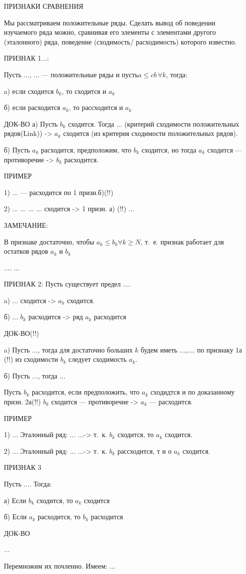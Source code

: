 \documentclass[../../main.tex]{subfiles}
\begin{document}
ПРИЗНАКИ СРАВНЕНИЯ

Мы рассматриваем положительные ряды.
Сделать вывод об поведении изучаемого ряда
можно, сравнивая его элементы с  элементами
другого (эталонного) ряда,  поведение (сходимость\slash
расходимость) которого известно.

ПРИЗНАК 1...:

Пусть ..., ... --- положительные ряды и пусть$a \leq cb \, \forall k$,
тогда:

a) если сходится $b_k$, то сходится и $a_k$

б) если расходится $a_k$, то рассходится и $a_k$

ДОК-ВО
а) Пусть $b_k$ сходится. Тогда ... 
(критерий сходимости положительных рядов(Link))
-> $a_k$ сходится (из критерия сходимости положительных рядов).

б) Пусть $a_k$ расходится, предположим, что $b_k$
сходится, но тогда $a_k$ сходится --- противоречие 
-> $b_k$ расходится.

ПРИМЕР

1) ... --- расходится по 1 призн.б)(!!)

2) ... ... ... ... сходится -> 1 призн. а) (!!)
...

ЗАМЕЧАНИЕ:

В признаке достаточно, чтобы $a_k \leq b_k \forall k \geq N$, т.~е.
признак работает для  остатков рядов $a_k$ и $b_k$

....
...

ПРИЗНАК 2:
 Пусть существует предел  ....
 
 a) ... сходится -> $a_k$ сходится.
 
 б) ... $b_k$ расходится -> ряд $a_k$ расходится
 
 ДОК-ВО(!!)
 
 a) Пусть ..., тогда для достаточно больших $k$ будем иметь ...,....  
 по признаку 1а (!!) из сходимости $b_k$ следует сходимость $a_k$.
 
 б) Пусть ..., тогда ...
 
 Пусть $b_k$ расходится, если предположить, что $a_k$ 
 сходидтся и по доказанному призн. 2а(!!) $b_k$ сходится ---
 противоречие  -> $a_k$ --- расходится.
 
 ПРИМЕР
 
 1) ... Эталонный ряд: ...
 ...-> т.~к. $b_k$ сходится, то $a_k$ сходится.
 
 2) ... Эталонный ряд: ...
...-> т.~к. $b_k$ рассходится, т и о $a_k$ сходится.

ПРИЗНАК 3

Пусть .... Тогда:

а) Если $b_k$ сходится, то $a_k$ сходится 

б) Если $a_k$ расходится, то  $b_k$ расходится

ДОК-ВО

...

Перемножим их почленно. Имеем:
...
\end{document}
